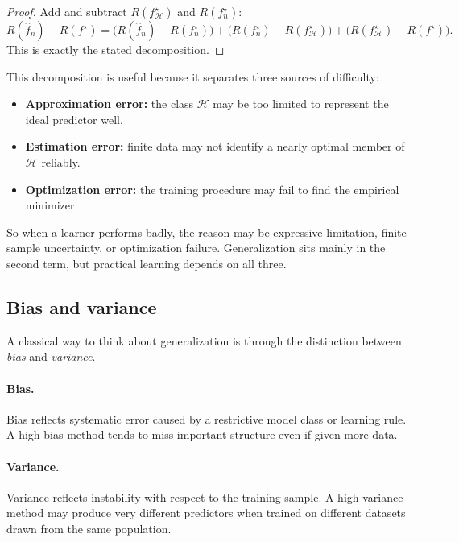 \begin{proof}
Add and subtract $R(f_{\mathcal H}^\star)$ and $R(f_n^\star)$:
\[
R(\hat f_n)-R(f^\star)
=
\bigl(R(\hat f_n)-R(f_n^\star)\bigr)
+
\bigl(R(f_n^\star)-R(f_{\mathcal H}^\star)\bigr)
+
\bigl(R(f_{\mathcal H}^\star)-R(f^\star)\bigr).
\]
This is exactly the stated decomposition.
\end{proof}

This decomposition is useful because it separates three sources of difficulty:

\begin{itemize}
    \item \textbf{Approximation error:} the class $\mathcal H$ may be too limited to represent the ideal predictor well.
    \item \textbf{Estimation error:} finite data may not identify a nearly optimal member of $\mathcal H$ reliably.
    \item \textbf{Optimization error:} the training procedure may fail to find the empirical minimizer.
\end{itemize}

So when a learner performs badly, the reason may be expressive limitation, finite-sample uncertainty, or optimization failure. Generalization sits mainly in the second term, but practical learning depends on all three.

\subsection*{Bias and variance}

A classical way to think about generalization is through the distinction between \emph{bias} and \emph{variance}.

\paragraph{Bias.}
Bias reflects systematic error caused by a restrictive model class or learning rule. A high-bias method tends to miss important structure even if given more data.

\paragraph{Variance.}
Variance reflects instability with respect to the training sample. A high-variance method may produce very different predictors when trained on different datasets drawn from the same population.

